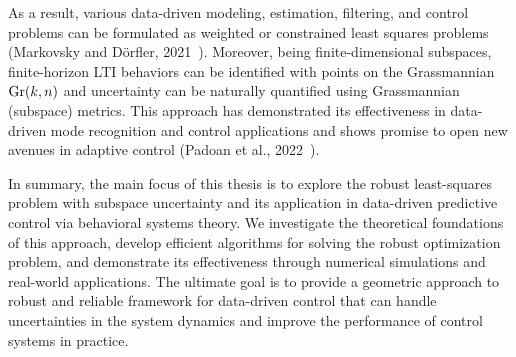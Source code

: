 As a result, various data-driven modeling, estimation, filtering, and control problems can be formulated as weighted or constrained least squares problems (Markovsky and D\"orfler, 2021~\cite{markovsky2021}). Moreover, being finite-dimensional subspaces, finite-horizon LTI behaviors can be identified with points on the Grassmannian $\text{Gr}(k, n)$ and uncertainty can be naturally quantified using Grassmannian (subspace) metrics. This approach has demonstrated its effectiveness in data-driven mode recognition and control applications and shows promise to open new avenues in adaptive control (Padoan et al., 2022~\cite{padoan2022}).

In summary, the main focus of this thesis is to explore the robust least-squares problem with subspace uncertainty and its application in data-driven predictive control via behavioral systems theory. We investigate the theoretical foundations of this approach, develop efficient algorithms for solving the robust optimization problem, and demonstrate its effectiveness through numerical simulations and real-world applications. The ultimate goal is to provide a geometric approach to robust and reliable framework for data-driven control that can handle uncertainties in the system dynamics and improve the performance of control systems in practice.